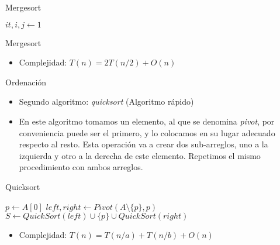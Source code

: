 \documentclass[]{beamer}
\begin{document}
\begin{frame}{Mergesort}
  \begin{algorithm}[H]
    \BlankLine
    $it, i, j \leftarrow 1$  
  \end{algorithm}
\end{frame}

\begin{frame}{Mergesort}
  \begin{itemize}
    \item Complejidad: \pause $T(n)=2T(n/2) + O(n)$
  \end{itemize}
\end{frame}



\begin{frame}{Ordenaci\'on}
  \begin{itemize}
    \item Segundo algoritmo: \textit{quicksort} (Algoritmo r\'apido)
      \pause
    \item En este algoritmo tomamos un elemento, al que se denomina
      \textit{pivot}, por conveniencia puede ser el
      primero, y lo colocamos en su lugar adecuado respecto al resto. Esta
      operaci\'on va a crear dos sub-arreglos, uno a la izquierda y otro a la
      derecha de este elemento. Repetimos el mismo procedimiento con ambos
      arreglos.
  \end{itemize}
\end{frame}

\begin{frame}{Quicksort}
  \begin{algorithm}[H]
    \BlankLine
    {
    }
    $p \leftarrow A[0]$ \;
    $left, right \leftarrow Pivot(A\setminus \{p\}, p)$ \;
    $S \leftarrow QuickSort(left) \cup \{p\} \cup QuickSort(right)$ \;
  \end{algorithm}
  \pause
  \begin{itemize}
    \item Complejidad: \pause $T(n)=T(n/a) + T(n/b) + O(n)$
  \end{itemize}
\end{frame}
\end{document}
